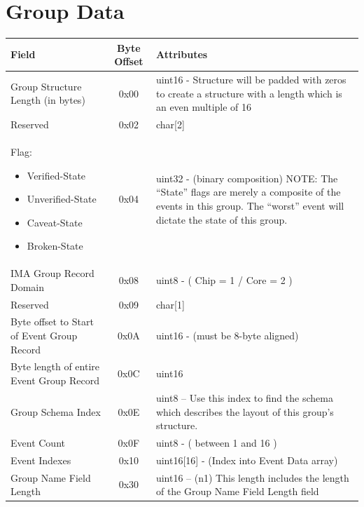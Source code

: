 \documentclass[14]{article}
\begin{document}
\pagebreak

\section{Group Data}
\begin{tabular}[l]{|p{5cm}|c|p{7cm}|}
  \hline
  \textbf{Field} & \textbf{Byte Offset} & \textbf{Attributes} \\
  \hline
  Group Structure Length (in bytes) & 0x00 & uint16 - Structure will be padded
                                             with zeros to create a structure
                                             with a length which is an even
                                             multiple of 16 \\
  \hline
  Reserved & 0x02 & char[2] \\
  \hline
  \parbox[t]{5cm} {
  Flag:
  \begin{itemize}
    \renewcommand\labelitemi{--}
    \setlength\itemsep{-0.4em}
  \item Verified-State
  \item Unverified-State
  \item Caveat-State
  \item Broken-State
  \end{itemize}
  } & 0x04 & uint32 - (binary composition) NOTE: The “State” flags are merely
               a composite of the events in this group. The “worst” event will
               dictate the state of this group. \\
  \hline
  IMA Group Record Domain & 0x08 & uint8 - ( Chip = 1 / Core = 2 ) \\
  \hline
  Reserved & 0x09 & char[1] \\
  \hline
  Byte offset to Start of Event Group Record & 0x0A & uint16 - (must be 8-byte
                                                      aligned) \\
  \hline
  Byte length of entire Event Group Record & 0x0C & uint16 \\
  \hline
  Group Schema Index & 0x0E & uint8 – Use this index to find the schema which
                              describes the layout of this group's structure. \\
  \hline
  Event Count & 0x0F & uint8 - ( between 1 and 16 ) \\
  \hline
  Event Indexes & 0x10 & uint16[16] - (Index into Event Data array) \\
  \hline
  Group Name Field Length & 0x30 & uint16 – (n1) This length includes the length
                                   of the Group Name Field Length field \\

\end{tabular}
\end{document}
